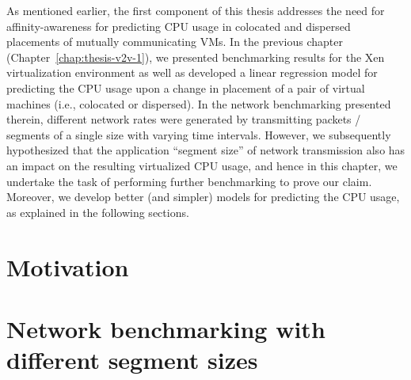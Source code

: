 As mentioned earlier, the first component of
this thesis addresses the need for affinity-awareness for predicting CPU
usage in colocated and dispersed placements of mutually communicating
VMs. 
In the previous chapter (Chapter~\ref{chap:thesis-v2v-1}), we presented benchmarking results for
the Xen virtualization environment as well as developed a linear
regression model for predicting the CPU usage upon a change in placement
of a pair of virtual machines (i.e., colocated or dispersed).
In the network benchmarking presented therein, different 
network rates were generated by transmitting packets / segments of
a single size with varying time intervals.
However, we subsequently hypothesized that the
application ``segment size'' of network transmission also has an impact 
on the resulting virtualized CPU usage, and hence in this chapter,
we undertake the task of performing further benchmarking to
prove our claim. Moreover, we develop better (and simpler) models for predicting
the CPU usage, as explained in the following sections.


\section{Motivation} 
\label{sec:2ndchap-intro} 
 

% 



\section{Network benchmarking with different segment sizes}
\label{sec:2ndchap-benchmark} 


